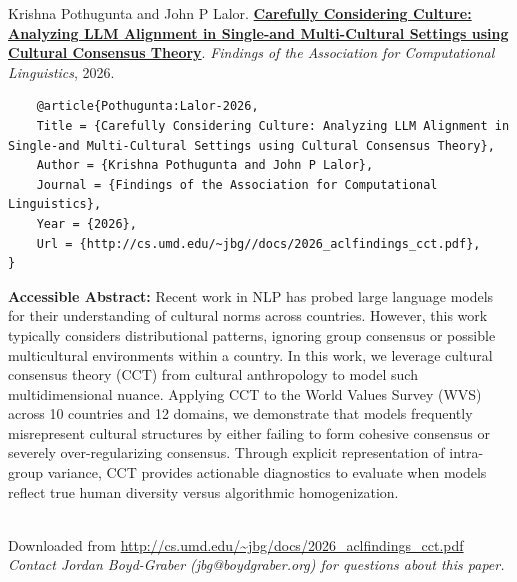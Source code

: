 \documentclass[a4paper]{article}
\begin{document}
    Krishna Pothugunta and John P Lalor.  {\bf \href{http://cs.umd.edu/~jbg//docs/2026_aclfindings_cct.pdf}{Carefully Considering Culture: Analyzing LLM Alignment in Single-and Multi-Cultural Settings using Cultural Consensus Theory}}.  \emph{Findings of the Association for Computational Linguistics}, 2026.



    \vspace{5cm}

    \begin{verbatim}
    @article{Pothugunta:Lalor-2026,
	Title = {Carefully Considering Culture: Analyzing LLM Alignment in Single-and Multi-Cultural Settings using Cultural Consensus Theory},
	Author = {Krishna Pothugunta and John P Lalor},
	Journal = {Findings of the Association for Computational Linguistics},
	Year = {2026},
	Url = {http://cs.umd.edu/~jbg//docs/2026_aclfindings_cct.pdf},
}

    \end{verbatim}

    {\bf Accessible Abstract:} Recent work in NLP has probed large language models for their understanding of cultural norms across countries. However, this work typically considers distributional patterns, ignoring group consensus or possible multicultural environments within a country. In this work, we leverage cultural consensus theory (CCT) from cultural anthropology to model such multidimensional nuance. Applying CCT to the World Values Survey (WVS) across 10 countries and 12 domains, we demonstrate that models frequently misrepresent cultural structures by either failing to form cohesive consensus or severely over-regularizing consensus. Through explicit representation of intra-group variance, CCT provides actionable diagnostics to evaluate when models reflect true human diversity versus algorithmic homogenization.\\~

    

    

    \vspace{3cm}
    Downloaded from \url{http://cs.umd.edu/~jbg/docs/2026_aclfindings_cct.pdf}  \\

    \vspace{2cm}
    \textit{Contact Jordan Boyd-Graber (jbg@boydgraber.org) for questions about this paper.}

    

    
\end{document}
